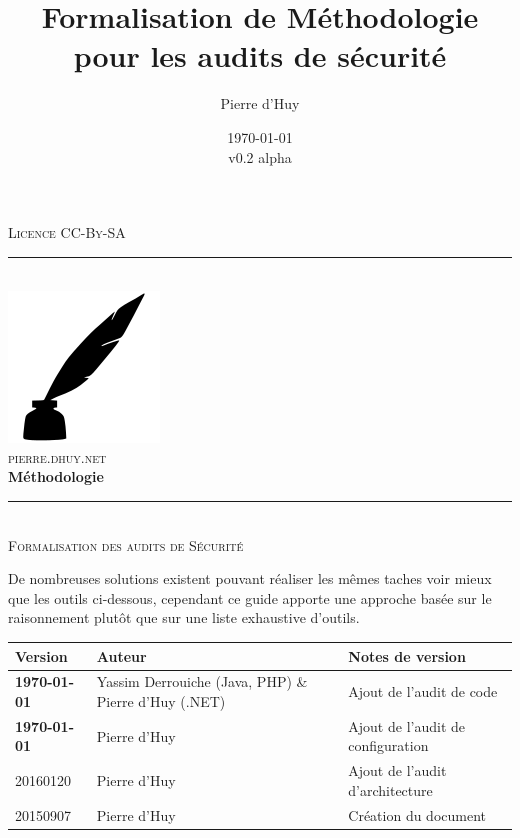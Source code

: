 \documentclass[twoside,a4paper,12pt,titlepage]{book}
\title{Formalisation de Méthodologie pour les audits de sécurité}
\author{Pierre d'Huy}
\date{\today\\v0.2 alpha}
\newcommand{\HRule}{\rule{\linewidth}{0.5mm}}
\begin{document}
\begin{titlepage}
	\begin{center}
		\textsc{\footnotesize Licence CC-By-SA}
		\HRule \\[2cm]
		\hspace{1cm}\includegraphics[width=.3\textwidth]{feather.png}\\
		\textsc{\large pierre.dhuy.net}\\[2.5cm]
			{ \huge \bfseries Méthodologie \\[0.3cm] }
		\HRule \\[0.5cm]
		\textsc{\huge Formalisation des audits de Sécurité}
	\end{center}
\end{titlepage}

\begin{Warning}
De nombreuses solutions existent pouvant réaliser les mêmes taches voir mieux que les outils ci-dessous, cependant ce guide apporte une approche basée sur le raisonnement plutôt que sur une liste exhaustive d'outils.
\end{Warning}
\vfill
\begin{tabular}{|p{2cm} | p{6cm} | p{6cm}|}
	\hline
	Version & Auteur & Notes de version\\
	\hline
	\textbf{\today} & Yassim Derrouiche (Java, PHP) \& Pierre d'Huy (.NET) & Ajout de l'audit de code\\
	\hline
	\textbf{\today} & Pierre d'Huy & Ajout de l'audit de configuration\\
	\hline
	20160120 & Pierre d'Huy & Ajout de l'audit d'architecture\\
	\hline
	20150907 & Pierre d'Huy & Création du document\\
	\hline	
\end{tabular}
\tableofcontents
\mainmatter
\end{document}
